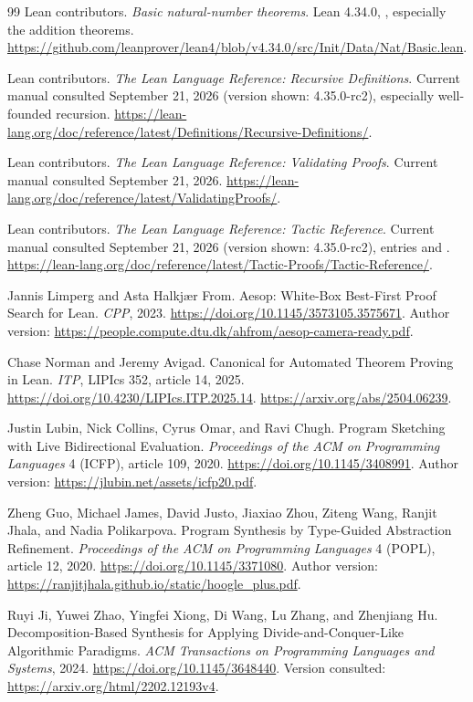 \begin{thebibliography}{99}
 Lean contributors. \emph{Basic natural-number theorems}.
Lean 4.34.0, , especially the addition theorems.
\url{https://github.com/leanprover/lean4/blob/v4.34.0/src/Init/Data/Nat/Basic.lean}.

 Lean contributors. \emph{The Lean Language Reference:
Recursive Definitions}. Current manual consulted September 21, 2026
(version shown: 4.35.0-rc2), especially well-founded recursion.
\url{https://lean-lang.org/doc/reference/latest/Definitions/Recursive-Definitions/}.

 Lean contributors. \emph{The Lean Language Reference:
Validating Proofs}. Current manual consulted September 21, 2026.
\url{https://lean-lang.org/doc/reference/latest/ValidatingProofs/}.

 Lean contributors. \emph{The Lean Language Reference:
Tactic Reference}. Current manual consulted September 21, 2026
(version shown: 4.35.0-rc2), entries  and .
\url{https://lean-lang.org/doc/reference/latest/Tactic-Proofs/Tactic-Reference/}.

 Jannis Limperg and Asta Halkj{\ae}r From.
Aesop: White-Box Best-First Proof Search for Lean. \emph{CPP}, 2023.
\url{https://doi.org/10.1145/3573105.3575671}.
Author version: \url{https://people.compute.dtu.dk/ahfrom/aesop-camera-ready.pdf}.

 Chase Norman and Jeremy Avigad.
Canonical for Automated Theorem Proving in Lean.
\emph{ITP}, LIPIcs 352, article 14, 2025.
\url{https://doi.org/10.4230/LIPIcs.ITP.2025.14}.
\url{https://arxiv.org/abs/2504.06239}.

 Justin Lubin, Nick Collins, Cyrus Omar, and Ravi Chugh.
Program Sketching with Live Bidirectional Evaluation.
\emph{Proceedings of the ACM on Programming Languages} 4 (ICFP), article 109, 2020.
\url{https://doi.org/10.1145/3408991}.
Author version: \url{https://jlubin.net/assets/icfp20.pdf}.

 Zheng Guo, Michael James, David Justo, Jiaxiao Zhou,
Ziteng Wang, Ranjit Jhala, and Nadia Polikarpova.
Program Synthesis by Type-Guided Abstraction Refinement.
\emph{Proceedings of the ACM on Programming Languages} 4 (POPL), article 12, 2020.
\url{https://doi.org/10.1145/3371080}.
Author version: \url{https://ranjitjhala.github.io/static/hoogle_plus.pdf}.

 Ruyi Ji, Yuwei Zhao, Yingfei Xiong, Di Wang,
Lu Zhang, and Zhenjiang Hu.
Decomposition-Based Synthesis for Applying Divide-and-Conquer-Like Algorithmic Paradigms.
\emph{ACM Transactions on Programming Languages and Systems}, 2024.
\url{https://doi.org/10.1145/3648440}.
Version consulted: \url{https://arxiv.org/html/2202.12193v4}.


\end{thebibliography}
